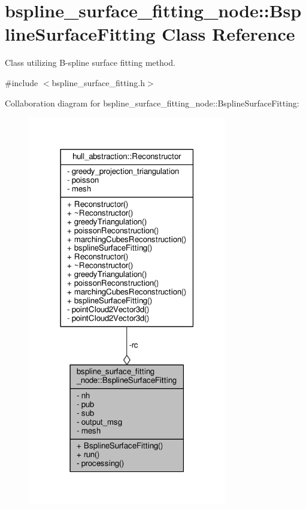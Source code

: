 \hypertarget{classbspline__surface__fitting__node_1_1_bspline_surface_fitting}{}\section{bspline\+\_\+surface\+\_\+fitting\+\_\+node\+:\+:Bspline\+Surface\+Fitting Class Reference}
\label{classbspline__surface__fitting__node_1_1_bspline_surface_fitting}


Class utilizing B-\/spline surface fitting method.  




{\ttfamily \#include $<$bspline\+\_\+surface\+\_\+fitting.\+h$>$}



Collaboration diagram for bspline\+\_\+surface\+\_\+fitting\+\_\+node\+:\+:Bspline\+Surface\+Fitting\+:
\nopagebreak
\begin{figure}[H]
\begin{center}
\leavevmode
\includegraphics[width=246pt]{classbspline__surface__fitting__node_1_1_bspline_surface_fitting__coll__graph}
\end{center}
\end{figure}
